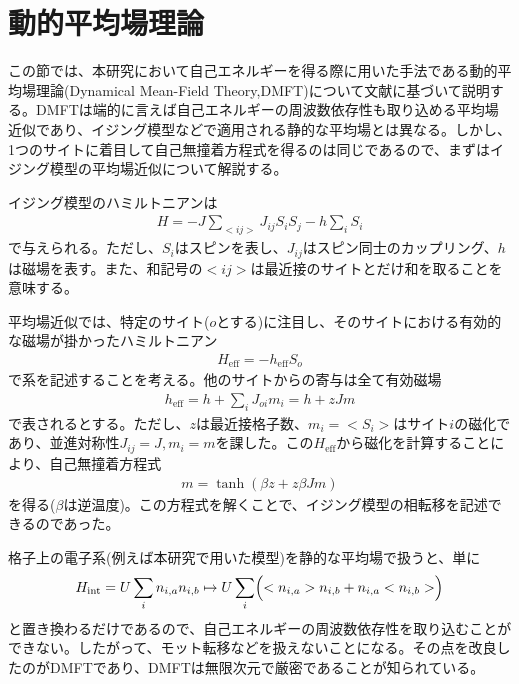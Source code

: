 \documentclass[12pt]{jsbook}
\begin{document}
\section{動的平均場理論}%
この節では、本研究において自己エネルギーを得る際に用いた手法である動的平均場理論(Dynamical Mean-Field Theory,DMFT)について文献\cite{RevModPhys.68.13}に基づいて説明する。DMFTは端的に言えば自己エネルギーの周波数依存性も取り込める平均場近似であり、イジング模型などで適用される静的な平均場とは異なる。しかし、1つのサイトに着目して自己無撞着方程式を得るのは同じであるので、まずはイジング模型の平均場近似について解説する。

イジング模型のハミルトニアンは
\begin{eqnarray}
    H=-J\displaystyle\sum_{<ij>}J_{ij}S_iS_j -h\sum_i S_i
\end{eqnarray}
で与えられる。ただし、$S_i$はスピンを表し、$J_{ij}$はスピン同士のカップリング、$h$は磁場を表す。また、和記号の$<ij>$は最近接のサイトとだけ和を取ることを意味する。

平均場近似では、特定のサイト($o$とする)に注目し、そのサイトにおける有効的な磁場が掛かったハミルトニアン
\begin{eqnarray}
H_{\mathrm{eff}} = -h_{\mathrm{eff}}S_o
\end{eqnarray}
で系を記述することを考える。他のサイトからの寄与は全て有効磁場
\begin{eqnarray}
    h_{\mathrm{eff}}=h + \sum_{i}J_{oi}m_i=h+zJm
\end{eqnarray}
で表されるとする。ただし、$z$は最近接格子数、$m_i = <S_i>$はサイト$i$の磁化であり、並進対称性$J_{ij} = J,m_i = m$を課した。この$H_\mathrm{eff}$から磁化を計算することにより、自己無撞着方程式
\begin{eqnarray}
    m=\tanh(\beta z + z\beta Jm)
\end{eqnarray}
を得る($\beta$は逆温度)。この方程式を解くことで、イジング模型の相転移を記述できるのであった。

格子上の電子系(例えば本研究で用いた模型)を静的な平均場で扱うと、単に
\begin{eqnarray}
    H_\mathrm{int} = U\displaystyle \sum_i n_{i,a}n_{i,b}\mapsto U\sum_i\Bigl( <n_{i,a}>n_{i,b}+n_{i,a}<n_{i,b}>\Bigr)
\end{eqnarray}
と置き換わるだけであるので、自己エネルギーの周波数依存性を取り込むことができない。したがって、モット転移などを扱えないことになる。その点を改良したのがDMFTであり、DMFTは無限次元で厳密であることが知られている。
\end{document}
